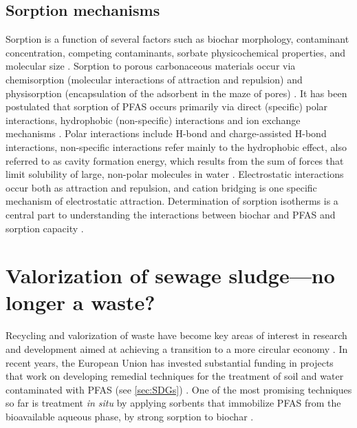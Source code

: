 \subsection{Sorption mechanisms}\label{sec:mechanisms}
Sorption is a function of several factors such as biochar morphology, contaminant concentration, competing contaminants, sorbate physicochemical properties, and molecular size \citep{Li2019,du2014adsorption}. Sorption to porous carbonaceous materials occur via chemisorption (molecular interactions of attraction and repulsion) and physisorption (encapsulation of the adsorbent in the maze of pores) \citep{Li2019}. It has been postulated that sorption of PFAS occurs primarily via direct (specific) polar interactions, hydrophobic (non-specific) interactions and ion exchange mechanisms \citep{Hale2017fire,yu2009sorption}. Polar interactions include H-bond and charge-assisted H-bond interactions, non-specific interactions refer mainly to the hydrophobic effect, also referred to as cavity formation energy, which results from the sum of forces that limit solubility of large, non-polar molecules in water \citep{Arp2006,sigmund2022sorption}. Electrostatic interactions occur both as attraction and repulsion, and cation bridging is one specific mechanism of electrostatic attraction. Determination of sorption isotherms is a central part to understanding the interactions between biochar and PFAS and sorption capacity \citep{yu2009sorption,Li2019}.


\section{Valorization of sewage sludge---no longer a waste?}
Recycling and valorization of waste have become key areas of interest in research and development aimed at achieving a transition to a more circular economy \citep{Ahmad2014}. In recent years, the European Union has invested substantial funding in projects that work on developing remedial techniques for the treatment of soil and water contaminated with PFAS (see \cref{sec:SDGs}) \citep{EC2020PFAS,ECHA2020}. One of the most promising techniques so far is treatment \textit{in situ} by applying sorbents that immobilize PFAS from the bioavailable aqueous phase, by strong sorption to biochar \citep{Ahmad2014,Sormo2021,Kupryianchyk2016b}. 

